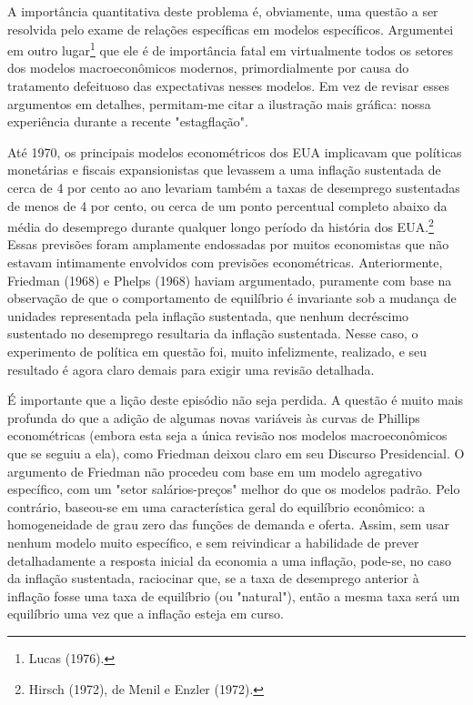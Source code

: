 \documentclass[12pt]{article}
\begin{document}
A importância quantitativa deste problema é, obviamente, uma questão a ser resolvida pelo exame de relações específicas em modelos específicos. Argumentei em outro lugar\footnote{Lucas (1976).} que ele é de importância fatal em virtualmente todos os setores dos modelos macroeconômicos modernos, primordialmente por causa do tratamento defeituoso das expectativas nesses modelos. Em vez de revisar esses argumentos em detalhes, permitam-me citar a ilustração mais gráfica: nossa experiência durante a recente "estagflação".

Até 1970, os principais modelos econométricos dos EUA implicavam que políticas monetárias e fiscais expansionistas que levassem a uma inflação sustentada de cerca de 4 por cento ao ano levariam também a taxas de desemprego sustentadas de menos de 4 por cento, ou cerca de um ponto percentual completo abaixo da média do desemprego durante qualquer longo período da história dos EUA.\footnote{Hirsch (1972), de Menil e Enzler (1972).} Essas previsões foram amplamente endossadas por muitos economistas que não estavam intimamente envolvidos com previsões econométricas. Anteriormente, Friedman (1968) e Phelps (1968) haviam argumentado, puramente com base na observação de que o comportamento de equilíbrio é invariante sob a mudança de unidades representada pela inflação sustentada, que nenhum decréscimo sustentado no desemprego resultaria da inflação sustentada. Nesse caso, o experimento de política em questão foi, muito infelizmente, realizado, e seu resultado é agora claro demais para exigir uma revisão detalhada.

É importante que a lição deste episódio não seja perdida. A questão é muito mais profunda do que a adição de algumas novas variáveis às curvas de Phillips econométricas (embora esta seja a única revisão nos modelos macroeconômicos que se seguiu a ela), como Friedman deixou claro em seu Discurso Presidencial. O argumento de Friedman não procedeu com base em um modelo agregativo específico, com um "setor salários-preços" melhor do que os modelos padrão. Pelo contrário, baseou-se em uma característica geral do equilíbrio econômico: a homogeneidade de grau zero das funções de demanda e oferta. Assim, sem usar nenhum modelo muito específico, e sem reivindicar a habilidade de prever detalhadamente a resposta inicial da economia a uma inflação, pode-se, no caso da inflação sustentada, raciocinar que, se a taxa de desemprego anterior à inflação fosse uma taxa de equilíbrio (ou "natural"), então a mesma taxa será um equilíbrio uma vez que a inflação esteja em curso.
\end{document}
